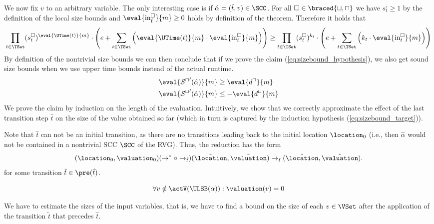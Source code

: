 We now fix $v$ to an arbitrary variable.
The only interesting case is if $\hat{\alpha} = (\hat{t}, v) \in \SCC$.
For all $\square \in \braced{\sqcup, \sqcap}$ we have $s^\square_t \geq 1$ by the definition of the local size bounds and $\eval{\text{in}^\square_{\hat{t}}}{m} \geq 0$ holds by definition of the theorem.
Therefore it holds that
\[ \prod_{t \in \TSet} (s^\square_t)^{\eval{\UTime(t)}{m}} \cdot \left( e + \sum_{t \in \TSet} \left( \eval{\UTime(t)}{m} \cdot \eval{\text{in}^\square_t}{m} \right) \right) \geq \prod_{t \in \TSet} (s^\square_t)^{k_t} \cdot \left( e + \sum_{t \in \TSet} \left( k_t \cdot \eval{\text{in}^\square_t}{m} \right) \right) \]
By definition of the nontrivial size bounds we can then conclude that if we prove the claim (\ref{eq:sizebound_hypothesis}), we also get sound size bounds when we use upper time bounds instead of the actual runtime.
\begin{equation}
  \begin{split}
    \eval{{\mathcal{S}^\sqcap}'(\hat{\alpha})}{m} & \geq \eval{d^\sqcap}{m} \\
    \eval{{\mathcal{S}^\sqcup}'(\hat{\alpha})}{m} & \leq -\eval{d^\sqcup}{m}
  \end{split}
\end{equation}
We prove the claim by induction on the length of the evaluation.
Intuitively, we show that we correctly approximate the effect of the last transition step $\hat{t}$ on the size of the value obtained so far (which in turn is captured by the induction hypothesis (\ref{eq:sizebound_target})).

Note that $\hat{t}$ can not be an initial transition, as there are no transitions leading back to the initial location $\location_0$
(i.e., then $\hat{\alpha}$ would not be contained in a nontrivial SCC $\SCC$ of the RVG).
Thus, the reduction has the form
\[ (\location_0, \valuation_0) (\rightarrow^* \circ \rightarrow_{\tilde{t}}) (\tilde{\location}, \tilde{\valuation}) \rightarrow_{\hat{t}} (\hat{\location}, \hat{\valuation}). \]
for some transition $\tilde{t} \in \pre(\hat{t})$.

\begin{equation} \label{eq:nonactiveequalzero}
  \forall v \notin \actV(\ULSB(\alpha)): \valuation(v) = 0
\end{equation}

We have to estimate the sizes of the input variables,
that is, we have to find a bound on the size of each $v \in \VSet$ after the application of the transition $\tilde{t}$ that precedes $\hat{t}$.

